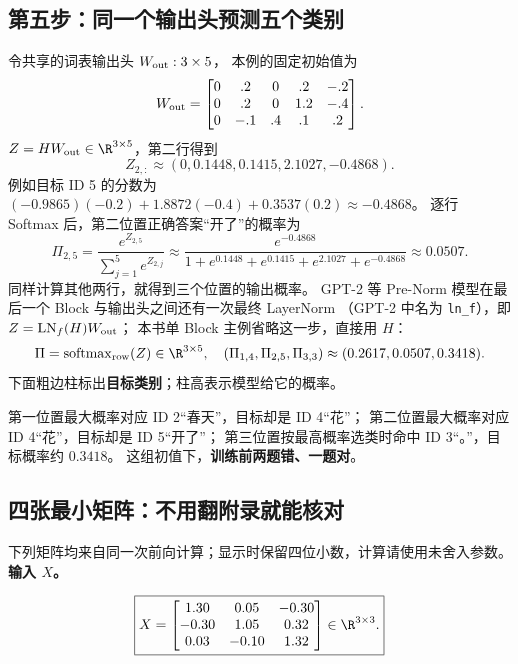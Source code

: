 \subsection{第五步：同一个输出头预测五个类别}
\label{partq:transformer}

令共享的词表输出头 $W_{\rm out}:3\times5$，
本例的固定初始值为
\[
W_{\rm out}=\begin{bmatrix}0&.2&0&.2&-.2\\0&.2&0&1.2&-.4\\0&-.1&.4&.1&.2\end{bmatrix}.
\]
$Z=HW_{\rm out}\in\R^{3\times5}$，第二行得到
\[
Z_{2,:}\approx(0,0.1448,0.1415,2.1027,-0.4868).
\]
例如目标 ID 5 的分数为
$(-0.9865)(-0.2)+1.8872(-0.4)+0.3537(0.2)\approx-0.4868$。
逐行 Softmax 后，第二位置正确答案“开了”的概率为
\[
\Pi_{2,5}=\frac{e^{Z_{2,5}}}{\sum_{j=1}^{5}e^{Z_{2,j}}}
\approx\frac{e^{-0.4868}}{1+e^{0.1448}+e^{0.1415}+e^{2.1027}+e^{-0.4868}}
\approx0.0507.
\]
同样计算其他两行，就得到三个位置的输出概率。
GPT-2 等 Pre-Norm 模型在最后一个 Block 与输出头之间还有一次最终 LayerNorm
（GPT-2 中名为 \texttt{ln\_f}），即 $Z=\operatorname{LN}_f(H)W_{\rm out}$；
本书单 Block 主例省略这一步，直接用 $H$：
\begin{equation}
\Pi=\operatorname{softmax}_{\rm row}(Z)\in\R^{3\times5},
\quad(\Pi_{1,4},\Pi_{2,5},\Pi_{3,3})
\approx(0.2617,0.0507,0.3418).
\label{eq:three-token-probabilities}
\end{equation}
下面粗边柱标出\textbf{目标类别}；柱高表示模型给它的概率。

\par\medskip


第一位置最大概率对应 ID 2“春天”，目标却是 ID 4“花”；
第二位置最大概率对应 ID 4“花”，目标却是 ID 5“开了”；
第三位置按最高概率选类时命中 ID 3“。”，目标概率约 $0.3418$。
这组初值下，\textbf{训练前两题错、一题对}。

\subsection*{四张最小矩阵：不用翻附录就能核对}
下列矩阵均来自同一次前向计算；显示时保留四位小数，计算请使用未舍入参数。
\noindent\textbf{输入 $X$。}\par
\begin{equation}
\boxed{X=\begin{bmatrix}
1.30&0.05&-0.30\\
-0.30&1.05&0.32\\
0.03&-0.10&1.32
\end{bmatrix}\in\R^{3\times3}.}
\end{equation}

